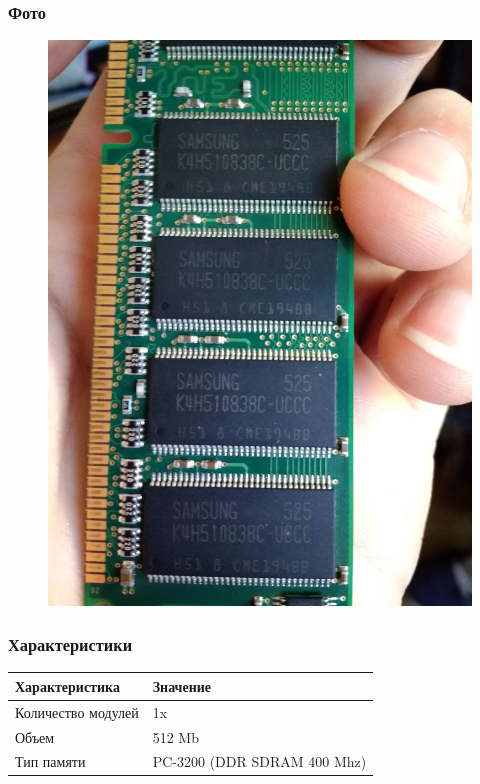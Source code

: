 \documentclass[a4paper]{article}
\begin{document}
\subsubsection{Фото}
\begin{figure}[H]
\centering
\includegraphics[scale=0.1]{ram.jpg} 
\end{figure}
\subsubsection{Характеристики}
\begin{table}[H]
    \centering
    \begin{tabular}{|l|l|}
    \hline
    Характеристика & Значение \\
    \hline
    Количество модулей & 1x \\
    Объем & 512 Mb \\
    Тип памяти & PC-3200 (DDR SDRAM 400 Mhz) \\
    \hline
\end{tabular}
\end{table}
\end{document}

